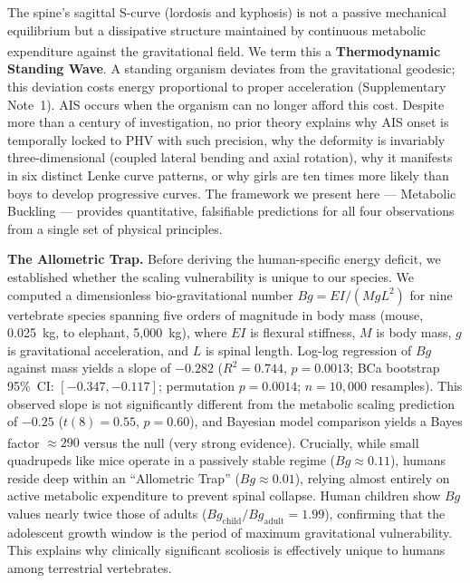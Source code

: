 \documentclass[12pt]{article}
\begin{document}
\vspace{1em}


The spine's sagittal S-curve (lordosis and kyphosis) is not a passive mechanical equilibrium but a dissipative structure maintained by continuous metabolic expenditure against the gravitational field\textsuperscript{\cite{latimer2005,thompson1917}}. We term this a \textbf{Thermodynamic Standing Wave}. A standing organism deviates from the gravitational geodesic; this deviation costs energy proportional to proper acceleration (Supplementary Note~1). AIS occurs when the organism can no longer afford this cost. Despite more than a century of investigation, no prior theory explains why AIS onset is temporally locked to PHV with such precision, why the deformity is invariably three-dimensional (coupled lateral bending and axial rotation), why it manifests in six distinct Lenke curve patterns, or why girls are ten times more likely than boys to develop progressive curves. The framework we present here --- Metabolic Buckling --- provides quantitative, falsifiable predictions for all four observations from a single set of physical principles.

\textbf{The Allometric Trap.} Before deriving the human-specific energy deficit, we established whether the scaling vulnerability is unique to our species. We computed a dimensionless bio-gravitational number $Bg = EI/(MgL^2)$ for nine vertebrate species spanning five orders of magnitude in body mass (mouse, 0.025~kg, to elephant, 5{,}000~kg), where $EI$ is flexural stiffness, $M$ is body mass, $g$ is gravitational acceleration, and $L$ is spinal length. Log-log regression of $Bg$ against mass yields a slope of $-0.282$ ($R^2 = 0.744$, $p = 0.0013$; BCa bootstrap 95\%~CI: $[-0.347, -0.117]$; permutation $p = 0.0014$; $n = 10{,}000$ resamples). This observed slope is not significantly different from the metabolic scaling prediction of $-0.25$ ($t(8) = 0.55$, $p = 0.60$), and Bayesian model comparison yields a Bayes factor $\approx 290$ versus the null (very strong evidence)\textsuperscript{\cite{west1997}}. Crucially, while small quadrupeds like mice operate in a passively stable regime ($Bg \approx 0.11$), humans reside deep within an ``Allometric Trap'' ($Bg \approx 0.01$), relying almost entirely on active metabolic expenditure to prevent spinal collapse. Human children show $Bg$ values nearly twice those of adults ($Bg_{\text{child}}/Bg_{\text{adult}} = 1.99$), confirming that the adolescent growth window is the period of maximum gravitational vulnerability. This explains why clinically significant scoliosis is effectively unique to humans among terrestrial vertebrates.
\end{document}
